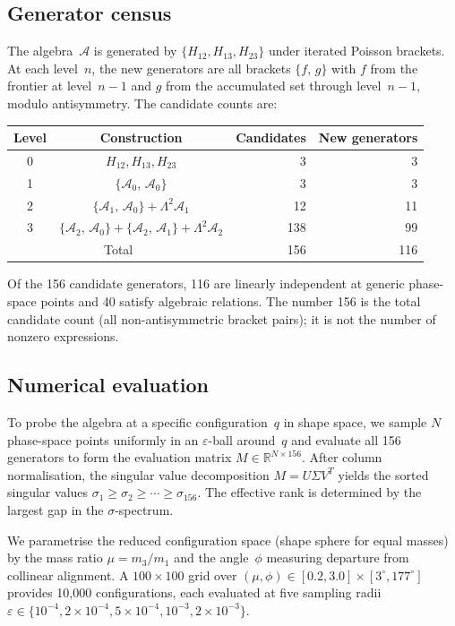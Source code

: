 \documentclass[11pt,a4paper]{article}
\theoremstyle{remark}
\newcommand{\pb}[2]{\{#1,\,#2\}}
\newcommand{\R}{\mathbb{R}}
\newcommand{\cA}{\mathcal{A}}
\begin{document}
\subsection{Generator census}

The algebra~$\cA$ is generated by $\{H_{12}, H_{13},
H_{23}\}$ under iterated Poisson brackets.  At each
level~$n$, the new generators are all brackets
$\pb{f}{g}$ with $f$ from the frontier at level~$n-1$
and $g$ from the accumulated set through level~$n-1$,
modulo antisymmetry.  The candidate counts are:
\begin{center}
\begin{tabular}{@{}ccrr@{}}
\toprule
Level & Construction & Candidates & New generators \\
\midrule
0 & $H_{12}, H_{13}, H_{23}$ & 3 & 3 \\
1 & $\pb{\cA_0}{\cA_0}$ & 3 & 3 \\
2 & $\pb{\cA_1}{\cA_0} + \Lambda^2\cA_1$ & 12 & 11 \\
3 & $\pb{\cA_2}{\cA_0} + \pb{\cA_2}{\cA_1}
    + \Lambda^2\cA_2$ & 138 & 99 \\
\midrule
\multicolumn{2}{c}{Total} & 156 & 116 \\
\bottomrule
\end{tabular}
\end{center}
Of the 156 candidate generators, 116 are linearly
independent at generic phase-space points and 40 satisfy
algebraic relations.  The number 156 is the total
candidate count (all non-antisymmetric bracket pairs);
it is not the number of nonzero expressions.

\subsection{Numerical evaluation}

To probe the algebra at a specific configuration~$q$ in
shape space, we sample $N$ phase-space points uniformly
in an $\varepsilon$-ball around~$q$ and evaluate all 156
generators to form the evaluation matrix
$M \in \R^{N \times 156}$.  After column
normalisation, the singular value decomposition
$M = U\Sigma V^T$ yields the sorted singular values
$\sigma_1 \ge \sigma_2 \ge \cdots \ge \sigma_{156}$.
The effective rank is determined by the largest gap in the
$\sigma$-spectrum.

We parametrise the reduced configuration space (shape
sphere for equal masses) by the mass ratio
$\mu = m_3 / m_1$ and the angle~$\phi$ measuring
departure from collinear alignment.  A $100 \times 100$
grid over $(\mu, \phi) \in [0.2, 3.0] \times [3^\circ,
177^\circ]$ provides 10{,}000 configurations, each
evaluated at five sampling radii
$\varepsilon \in \{10^{-4}, 2\times 10^{-4},
5\times 10^{-4}, 10^{-3}, 2\times 10^{-3}\}$.
\end{document}
